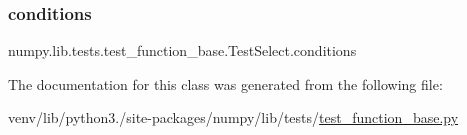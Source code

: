 \subsubsection{\texorpdfstring{conditions}{conditions}}
{\footnotesize\ttfamily numpy.\+lib.\+tests.\+test\+\_\+function\+\_\+base.\+Test\+Select.\+conditions\hspace{0.3cm}{\ttfamily [static]}}



The documentation for this class was generated from the following file\+:\begin{DoxyCompactItemize}
\item 
venv/lib/python3./site-\/packages/numpy/lib/tests/\hyperlink{lib_2tests_2test__function__base_8py}{test\+\_\+function\+\_\+base.\+py}\end{DoxyCompactItemize}
